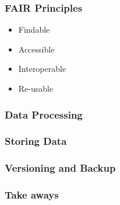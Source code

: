 \documentclass{beamer}
\begin{document}
\begin{frame}
  \frametitle{FAIR Principles}
  
  \begin{itemize}
  \item Findable
  \item Accessible
  \item Interoperable
  \item Re-usable
  \end{itemize}
\end{frame}

\begin{frame}
  \frametitle{Data Processing}
\end{frame}

\begin{frame}
  \frametitle{Storing Data}
\end{frame}

\begin{frame}
  \frametitle{Versioning and Backup}
\end{frame}

\begin{frame}
  \frametitle{Take aways}
  
\end{frame}
\end{document}
